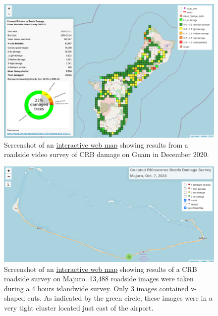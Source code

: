 \documentclass[11pt,english,letterpaper]{scrartcl}
\begin{document}
\begin{figure}[H]
	\centering
	\includegraphics[width=0.8\linewidth]{images/crb-webmap-2020-12.png}
	\caption{Screenshot of an \href{https://aubreymoore.github.io/Guam-CRB-damage-map-2020-12/webmap/v1}{interactive web map} showing results from a roadside video survey of	CRB damage on Guam in December 2020.}
	\label{fig:guam02}
\end{figure}

\begin{figure}[H]
	\centering
	\includegraphics[width=\linewidth]{images/majuro-webmap}
	\caption{Screenshot of an \href{https://aubreymoore.github.io/Majuro-CRB-damage-map-1/webmap}{interactive web map} showing results of a CRB roadside survey on Majuro. 13,488 roadside images were taken during a 4 hours islandwide survey. Only 3 images contained v-shaped cuts. As indicated by the green circle, these images were in a very tight cluster located just east of the airport.}
	\label{fig:majuro-webmap}
\end{figure}



	
\end{document}
